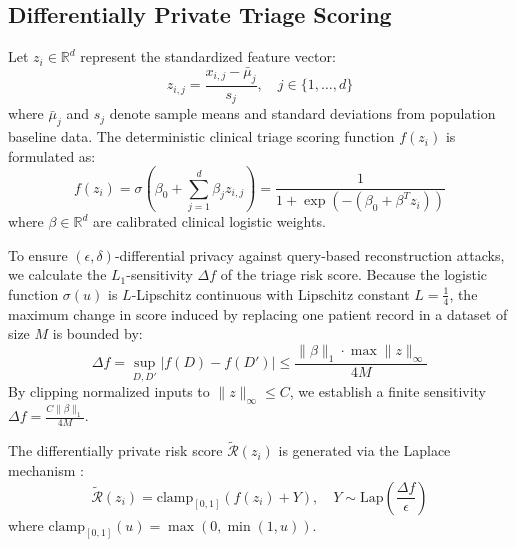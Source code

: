 \documentclass[conference]{IEEEtran}
\begin{document}
\subsection{Differentially Private Triage Scoring}
Let $z_i \in \mathbb{R}^d$ represent the standardized feature vector:
\begin{equation}
    z_{i,j} = \frac{x_{i,j} - \bar{\mu}_j}{s_j}, \quad j \in \{1, \dots, d\}
\end{equation}
where $\bar{\mu}_j$ and $s_j$ denote sample means and standard deviations from population baseline data. The deterministic clinical triage scoring function $f(z_i)$ is formulated as:
\begin{equation}
    f(z_i) = \sigma\left( \beta_0 + \sum_{j=1}^d \beta_j z_{i,j} \right) = \frac{1}{1 + \exp\left( -(\beta_0 + \beta^T z_i) \right)}
    \label{eq:triage_score}
\end{equation}
where $\beta \in \mathbb{R}^d$ are calibrated clinical logistic weights.

To ensure $(\epsilon, \delta)$-differential privacy against query-based reconstruction attacks, we calculate the $L_1$-sensitivity $\Delta f$ of the triage risk score. Because the logistic function $\sigma(u)$ is $L$-Lipschitz continuous with Lipschitz constant $L = \frac{1}{4}$, the maximum change in score induced by replacing one patient record in a dataset of size $M$ is bounded by:
\begin{equation}
    \Delta f = \sup_{D, D'} |f(D) - f(D')| \le \frac{\|\beta\|_1 \cdot \max \|z\|_\infty}{4 M}
    \label{eq:sensitivity}
\end{equation}
By clipping normalized inputs to $\|z\|_\infty \le C$, we establish a finite sensitivity $\Delta f = \frac{C \|\beta\|_1}{4 M}$.

The differentially private risk score $\tilde{\mathcal{R}}(z_i)$ is generated via the Laplace mechanism \cite{dwork2014algorithmic}:
\begin{equation}
    \tilde{\mathcal{R}}(z_i) = \text{clamp}_{[0, 1]}\left( f(z_i) + Y \right), \quad Y \sim \text{Lap}\left( \frac{\Delta f}{\epsilon} \right)
    \label{eq:noisy_score}
\end{equation}
where $\text{clamp}_{[0, 1]}(u) = \max(0, \min(1, u))$.
\end{document}
